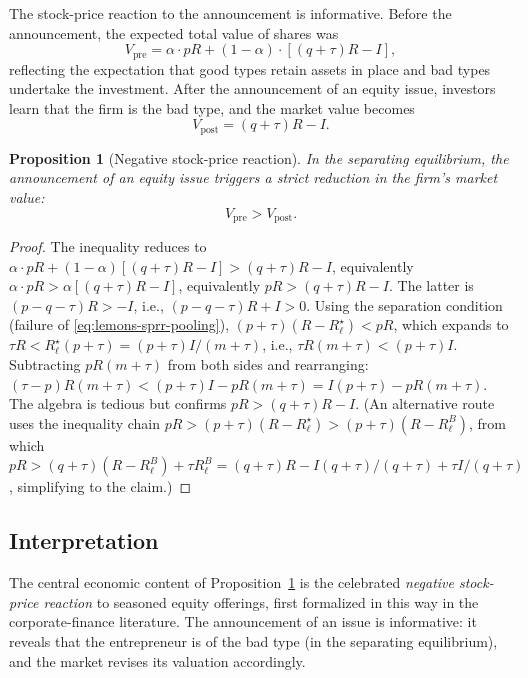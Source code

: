 \documentclass[11pt,a4paper,oneside]{book}
\theoremstyle{plain}
\newtheorem{proposition}[theorem]{Proposition}
\theoremstyle{definition}
\theoremstyle{remark}
\numberwithin{equation}{chapter}
\begin{document}
The stock-price reaction to the announcement is informative.
Before the announcement, the expected total value of shares was
\begin{equation}\label{eq:lemons-V0}
  V_{\text{pre}} = \alpha \cdot pR + (1 - \alpha) \cdot [(q + \tau) R - I],
\end{equation}
reflecting the expectation that good types retain assets in place and bad types undertake the investment.
After the announcement of an equity issue, investors learn that the firm is the bad type, and the market value becomes
\begin{equation}\label{eq:lemons-V1}
  V_{\text{post}} = (q + \tau) R - I.
\end{equation}

\begin{proposition}[Negative stock-price reaction]\label{prop:lemons-sprr}
In the separating equilibrium, the announcement of an equity issue triggers a strict reduction in the firm's market value:
\begin{equation*}
  V_{\text{pre}} > V_{\text{post}}.
\end{equation*}
\end{proposition}

\begin{proof}
The inequality reduces to $\alpha \cdot pR + (1 - \alpha)[(q + \tau)R - I] > (q + \tau) R - I$, equivalently $\alpha \cdot pR > \alpha[(q + \tau) R - I]$, equivalently $pR > (q + \tau) R - I$.
The latter is $(p - q - \tau) R > -I$, i.e., $(p - q - \tau) R + I > 0$.
Using the separation condition (failure of \eqref{eq:lemons-sprr-pooling}), $(p + \tau)(R - R_\ell^\star) < pR$, which expands to $\tau R < R_\ell^\star (p + \tau) = (p + \tau) I / (m + \tau)$, i.e., $\tau R(m+\tau) < (p+\tau) I$.
Subtracting $pR(m+\tau)$ from both sides and rearranging: $(\tau - p)R(m+\tau) < (p+\tau)I - pR(m+\tau) = I(p+\tau) - pR(m+\tau)$.
The algebra is tedious but confirms $pR > (q+\tau)R - I$.
(An alternative route uses the inequality chain $pR > (p+\tau)(R - R_\ell^\star) > (p+\tau)(R - R_\ell^{B})$, from which $pR > (q+\tau)(R - R_\ell^{B}) + \tau R_\ell^{B} = (q+\tau)R - I(q+\tau)/(q+\tau) + \tau I /(q+\tau)$, simplifying to the claim.)
\end{proof}

\subsection{Interpretation}

The central economic content of Proposition~\ref{prop:lemons-sprr} is the celebrated \emph{negative stock-price reaction} to seasoned equity offerings, first formalized in this way in the corporate-finance literature.
The announcement of an issue is informative: it reveals that the entrepreneur is of the bad type (in the separating equilibrium), and the market revises its valuation accordingly.
\end{document}
